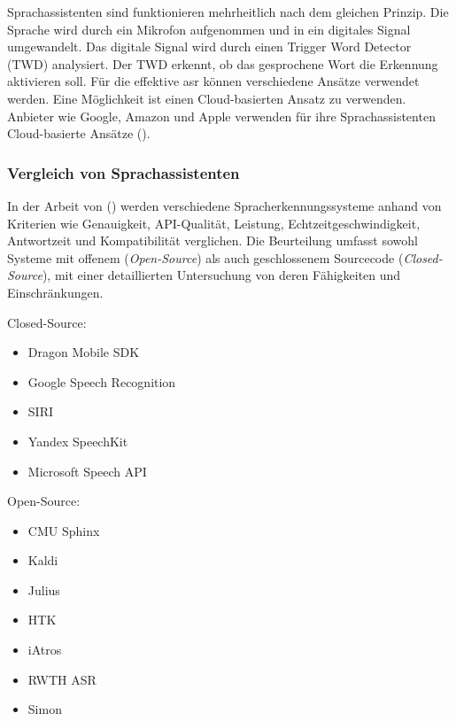 \documentclass[11pt,a4paper]{article}
\begin{document}
\noindent \newline
Sprachassistenten sind funktionieren mehrheitlich nach dem gleichen Prinzip. Die Sprache wird
durch ein Mikrofon aufgenommen und in ein digitales Signal umgewandelt. Das digitale Signal wird
durch einen Trigger Word Detector (TWD) analysiert. Der TWD erkennt, ob das gesprochene Wort die 
Erkennung aktivieren soll. Für die effektive \gls{asr} können verschiedene Ansätze verwendet
werden. Eine Möglichkeit ist einen Cloud-basierten Ansatz zu verwenden. Anbieter wie Google,
Amazon und Apple verwenden für ihre Sprachassistenten Cloud-basierte Ansätze 
(\cite{matarneh2017speechrecognition}). 

\subsubsection{Vergleich von Sprachassistenten}\label{sec:vergleich_sprachassistenten}

In der Arbeit von (\cite{matarneh2017speechrecognition}) werden verschiedene Spracherkennungssysteme 
anhand von Kriterien wie Genauigkeit, API-Qualität, Leistung, Echtzeitgeschwindigkeit, 
Antwortzeit und Kompatibilität verglichen. Die Beurteilung umfasst sowohl Systeme mit offenem 
(\textit{Open-Source}) als auch geschlossenem Sourcecode (\textit{Closed-Source}), mit einer 
detaillierten Untersuchung von deren Fähigkeiten und Einschränkungen.

\begin{multicols}{2}
	\small 
	\setlength\itemsep{0em} 
	
	\noindent Closed-Source:
	\begin{itemize}
	\item Dragon Mobile SDK
	\item Google Speech Recognition
	\item SIRI
	\item Yandex SpeechKit
	\item Microsoft Speech API
	\end{itemize}
	
	\columnbreak
	
	\noindent Open-Source:
	\begin{itemize}
	\item CMU Sphinx
	\item Kaldi
	\item Julius
	\item HTK
	\item iAtros
	\item RWTH ASR
	\item Simon
	\end{itemize}
	\end{multicols}
	
\end{document}
